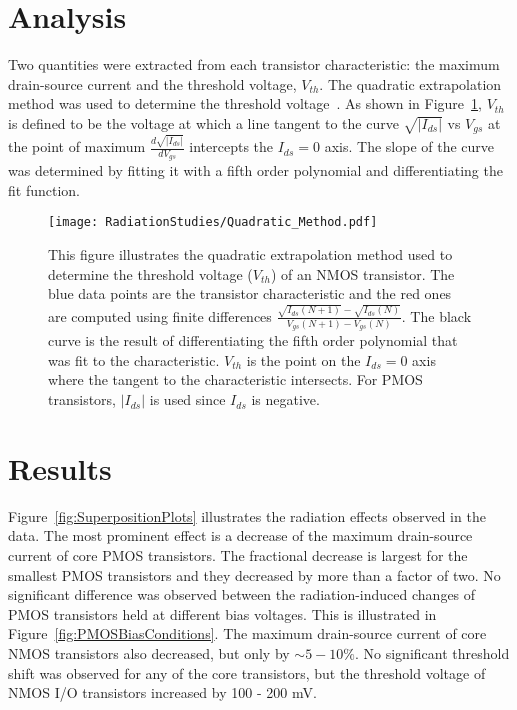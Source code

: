 \section{Analysis}

Two quantities were extracted from each transistor characteristic: the maximum drain-source current and the threshold voltage, $V_{th}$. The quadratic extrapolation method was used to determine the threshold voltage~\cite{QuadraticMethod}. As shown in Figure~\ref{fig:QuadraticMethod}, $V_{th}$ is defined to be the voltage at which a line tangent to the curve $\sqrt{|I_{ds}|}$ vs $V_{gs}$ at the point of maximum $\frac{d \sqrt{|I_{ds}|}}{dV_{gs}}$ intercepts the $I_{ds}=0$ axis. The slope of the curve was determined by fitting it with a fifth order polynomial and differentiating the fit function. 

\begin{figure}[htb!]
\begin{center}
\texttt{[image: RadiationStudies/Quadratic\_Method.pdf]}
\end{center}
\caption{This figure illustrates the quadratic extrapolation method used to determine the threshold voltage ($V_{th}$) of an NMOS transistor. The blue data points are the transistor characteristic and the red ones are computed using finite differences $\frac{\sqrt{I_{ds}(N+1)}-\sqrt{I_{ds}(N)}}{V_{gs}(N+1)-V_{gs}(N)}$. The black curve is the result of differentiating the fifth order polynomial that was fit to the characteristic. $V_{th}$ is the point on the $I_{ds}=0$ axis where the tangent to the characteristic intersects. For PMOS transistors, $|I_{ds}|$ is used since $I_{ds}$ is negative.}
\label{fig:QuadraticMethod}
\end{figure}

\section{Results}

Figure~\ref{fig:SuperpositionPlots}  illustrates the radiation effects observed in the data.  The most prominent effect is a decrease of the maximum drain-source current of core PMOS transistors.  The fractional decrease is largest for the smallest PMOS transistors and they decreased by more than a factor of two.  No significant difference was observed between the radiation-induced changes of PMOS transistors held at different bias voltages. This is illustrated in Figure~\ref{fig:PMOSBiasConditions}. The maximum drain-source current of core NMOS transistors also decreased, but only by $\sim5-10\%$.  No significant threshold shift was observed for any of the core transistors, but the threshold voltage of NMOS I/O transistors increased by 100 - 200 mV.  

